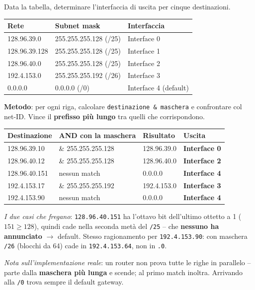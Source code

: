 \documentclass[12pt, a4paper]{article}
\begin{document}
\begin{tcolorbox}[colback=orange!5, colframe=orange!70!black, title=\textbf{Esercizio B.2 -- Tabella di inoltro}]
Data la tabella, determinare l'interfaccia di uscita per cinque destinazioni.

\begin{center}
\small
\begin{tabular}{lll}
\toprule
\textbf{Rete} & \textbf{Subnet mask} & \textbf{Interfaccia} \\
\midrule
128.96.39.0 & 255.255.255.128 (/25) & Interface 0 \\
128.96.39.128 & 255.255.255.128 (/25) & Interface 1 \\
128.96.40.0 & 255.255.255.128 (/25) & Interface 2 \\
192.4.153.0 & 255.255.255.192 (/26) & Interface 3 \\
0.0.0.0 & 0.0.0.0 (/0) & Interface 4 (default) \\
\bottomrule
\end{tabular}
\end{center}

\textbf{Metodo}: per ogni riga, calcolare \texttt{destinazione \& maschera} e confrontare col net-ID. Vince il \textbf{prefisso più lungo} tra quelli che corrispondono.

\begin{center}
\small
\begin{tabular}{llll}
\toprule
\textbf{Destinazione} & \textbf{AND con la maschera} & \textbf{Risultato} & \textbf{Uscita} \\
\midrule
128.96.39.10 & \& 255.255.255.128 & 128.96.39.0 & \textbf{Interface 0} \\
128.96.40.12 & \& 255.255.255.128 & 128.96.40.0 & \textbf{Interface 2} \\
128.96.40.151 & nessun match & 0.0.0.0 & \textbf{Interface 4} \\
192.4.153.17 & \& 255.255.255.192 & 192.4.153.0 & \textbf{Interface 3} \\
192.4.153.90 & nessun match & 0.0.0.0 & \textbf{Interface 4} \\
\bottomrule
\end{tabular}
\end{center}

\textit{I due casi che fregano}: \texttt{128.96.40.151} ha l'ottavo bit dell'ultimo ottetto a 1 ($151 \geq 128$), quindi cade nella seconda metà del \texttt{/25} -- che \textbf{nessuno ha annunciato} $\to$ default. Stesso ragionamento per \texttt{192.4.153.90}: con maschera \texttt{/26} (blocchi da 64) cade in \texttt{192.4.153.64}, non in \texttt{.0}.

\textit{Nota sull'implementazione reale}: un router non prova tutte le righe in parallelo -- parte dalla \textbf{maschera più lunga} e scende; al primo match inoltra. Arrivando alla \texttt{/0} trova sempre il default gateway.
\end{tcolorbox}
\end{document}
